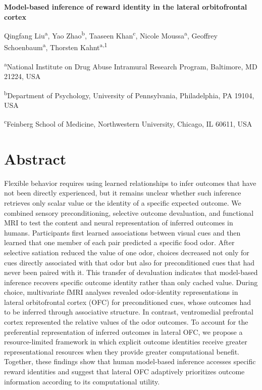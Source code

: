 \documentclass[12pt,letterpaper]{article}
\begin{document}
\raggedright

\begin{center}

{\Large\bfseries Model-based inference of reward identity in the lateral orbitofrontal cortex\par}

\medskip

Qingfang Liu\textsuperscript{a}, Yao Zhao\textsuperscript{b}, Taaseen Khan\textsuperscript{c}, Nicole Moussa\textsuperscript{a}, Geoffrey Schoenbaum\textsuperscript{a}, Thorsten Kahnt\textsuperscript{a,1}\par

\medskip

\textsuperscript{a}National Institute on Drug Abuse Intramural Research Program, Baltimore, MD 21224, USA\par

\textsuperscript{b}Department of Psychology, University of Pennsylvania,
Philadelphia, PA 19104, USA\par

\textsuperscript{c}Feinberg School of Medicine, Northwestern University,
Chicago, IL 60611, USA\par

\end{center}


\section*{Abstract}
Flexible behavior requires using learned relationships to infer outcomes that have not been directly experienced, but it remains unclear whether such inference retrieves only scalar value or the identity of a specific expected outcome. We combined sensory preconditioning, selective outcome devaluation, and functional MRI to test the content and neural representation of inferred outcomes in humans. Participants first learned associations between visual cues and then learned that one member of each pair predicted a specific food odor. After selective satiation reduced the value of one odor, choices decreased not only for cues directly associated with that odor but also for preconditioned cues that had never been paired with it. This transfer of devaluation indicates that model-based inference recovers specific outcome identity rather than only cached value. During choice, multivariate fMRI analyses revealed odor-identity representations in lateral orbitofrontal cortex (OFC) for preconditioned cues, whose outcomes had to be inferred through associative structure. In contrast, ventromedial prefrontal cortex represented the relative values of the odor outcomes. To account for the preferential representation of inferred outcomes in lateral OFC, we propose a resource-limited framework in which explicit outcome identities receive greater representational resources when they provide greater computational benefit. Together, these findings show that human model-based inference accesses specific reward identities and suggest that lateral OFC adaptively prioritizes outcome information according to its computational utility.
\end{document}
